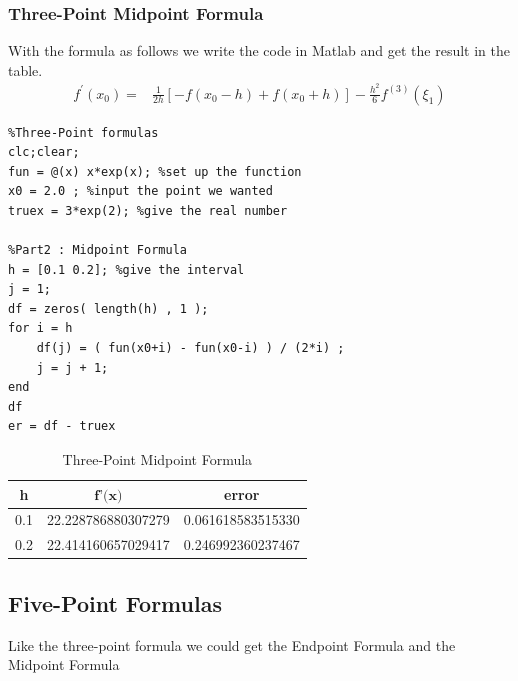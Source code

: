\documentclass{article}
\begin{document}
\subsubsection{Three-Point Midpoint Formula}
With the formula as follows we write the code in Matlab and get the result in the table.
\begin{align}
    f^{\prime}\left(x_{0}\right)=&\frac{1}{2 h}\left[-f\left(x_{0}-h\right)+f\left(x_{0}+h\right)\right]-\frac{h^{2}}{6} f^{(3)}\left(\xi_{1}\right)\nonumber
\end{align}
\begin{lstlisting}
%Three-Point formulas
clc;clear;
fun = @(x) x*exp(x); %set up the function
x0 = 2.0 ; %input the point we wanted
truex = 3*exp(2); %give the real number

%Part2 : Midpoint Formula
h = [0.1 0.2]; %give the interval
j = 1;
df = zeros( length(h) , 1 );
for i = h
    df(j) = ( fun(x0+i) - fun(x0-i) ) / (2*i) ; 
    j = j + 1;
end
df
er = df - truex
\end{lstlisting}
\begin{table}[!ht]
    \centering
    \begin{tabular}{|c|c|c|}
    \hline
        \textbf{h} & $\textbf{f'(x)}$ & \textbf{error} \\ \hline
        0.1 &   22.228786880307279  &    0.061618583515330  \\ \hline
        0.2 &   22.414160657029417  &    0.246992360237467  \\ \hline
    \end{tabular}
    \caption{Three-Point Midpoint Formula}
    \label{3PM}
\end{table}

\subsection{Five-Point Formulas}
Like the three-point formula we could get the Endpoint Formula and the Midpoint Formula
\end{document}
